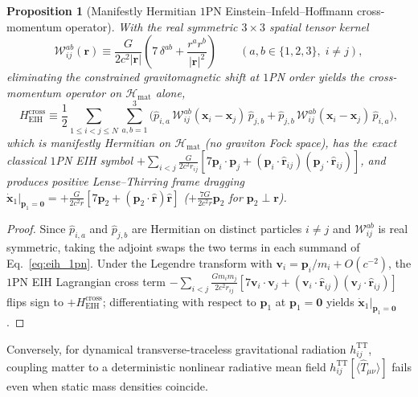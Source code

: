 \documentclass[aps,prd,onecolumn,tightenlines,nofootinbib,notitlepage,10pt,floatfix]{revtex4-2}
\theoremstyle{indentedtheorem}
\newtheorem{proposition}{Proposition}
\begin{document}
\begin{proposition}[Manifestly Hermitian $1$PN Einstein--Infeld--Hoffmann cross-momentum operator]\label{prop:eih_1pn}
With the real symmetric $3\times 3$ spatial tensor kernel
\begin{equation}
    \mathcal{W}_{ij}^{ab}(\mathbf{r}) \equiv \frac{G}{2c^2|\mathbf{r}|}\!\left(7\,\delta^{ab} + \frac{r^a r^b}{|\mathbf{r}|^2}\right) \qquad (a,b\in\{1,2,3\},\; i\neq j) ,
    \label{eq:eih_kernel}
\end{equation}
eliminating the constrained gravitomagnetic shift at $1$PN order yields the cross-momentum operator on $\mathcal{H}_\text{mat}$ alone,
\begin{equation}
    H_\text{EIH}^\text{cross} \equiv \frac{1}{2}\sum_{1\le i<j\le N}\sum_{a,b=1}^{3} \Big(\hat{p}_{i,a}\,\mathcal{W}_{ij}^{ab}(\mathbf{x}_i-\mathbf{x}_j)\,\hat{p}_{j,b} + \hat{p}_{j,b}\,\mathcal{W}_{ij}^{ab}(\mathbf{x}_i-\mathbf{x}_j)\,\hat{p}_{i,a}\Big) ,
    \label{eq:eih_1pn}
\end{equation}
which is manifestly Hermitian on $\mathcal{H}_\text{mat}$ (no graviton Fock space), has the exact classical $1$PN EIH symbol $+\sum_{i<j}\frac{G}{2c^2 r_{ij}}[7\mathbf{p}_i\cdot\mathbf{p}_j+(\mathbf{p}_i\cdot\hat{\mathbf{r}}_{ij})(\mathbf{p}_j\cdot\hat{\mathbf{r}}_{ij})]$, and produces positive Lense--Thirring frame dragging $\dot{\mathbf{x}}_1|_{\mathbf{p}_1=\mathbf{0}}=+\frac{G}{2c^2 r}[7\mathbf{p}_2+(\mathbf{p}_2\cdot\hat{\mathbf{r}})\hat{\mathbf{r}}]$ ($+\frac{7G}{2c^2 r}\mathbf{p}_2$ for $\mathbf{p}_2\perp\mathbf{r}$).
\end{proposition}
\begin{proof}
Since $\hat{p}_{i,a}$ and $\hat{p}_{j,b}$ are Hermitian on distinct particles $i\neq j$ and $\mathcal{W}_{ij}^{ab}$ is real symmetric, taking the adjoint swaps the two terms in each summand of Eq.~\eqref{eq:eih_1pn}. Under the Legendre transform with $\mathbf{v}_i=\mathbf{p}_i/m_i+O(c^{-2})$, the $1$PN EIH Lagrangian cross term $-\sum_{i<j}\frac{Gm_i m_j}{2c^2 r_{ij}}[7\mathbf{v}_i\cdot\mathbf{v}_j+(\mathbf{v}_i\cdot\hat{\mathbf{r}}_{ij})(\mathbf{v}_j\cdot\hat{\mathbf{r}}_{ij})]$ flips sign to $+H_\text{EIH}^\text{cross}$; differentiating with respect to $\mathbf{p}_1$ at $\mathbf{p}_1=\mathbf{0}$ yields $\dot{\mathbf{x}}_1|_{\mathbf{p}_1=\mathbf{0}}$.
\end{proof}

Conversely, for dynamical transverse-traceless gravitational radiation $h_{ij}^\text{TT}$, coupling matter to a deterministic nonlinear radiative mean field $h_{ij}^\text{TT}[\langle\hat{T}_{\mu\nu}\rangle]$ fails even when static mass densities coincide.
\end{document}
